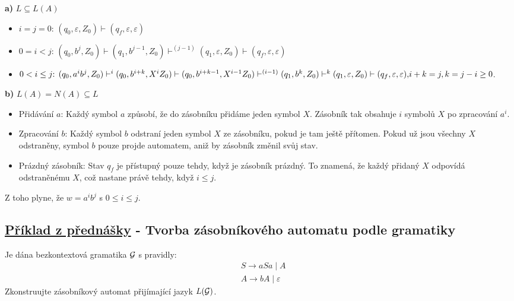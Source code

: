 \textbf{a)} $L \subseteq L(A)$
\begin{itemize}[leftmargin=*]
    \item $i=j=0 \text{: } (q_0, \varepsilon, Z_0) \vdash (q_f, \varepsilon, \varepsilon)$
    \item $0=i < j \text{: } (q_0, b^j, Z_0) \vdash (q_1, b^{j-1}, Z_0) \vdash^{(j-1)} (q_1, \varepsilon, Z_0) 
    \vdash (q_f, \varepsilon, \varepsilon)$
    \item ${0<i \leq j \text{: } (q_0, a^i b^j, Z_0) \vdash^i (q_0, b^{i+k}, X^i Z_0) \vdash (q_0, b^{i+k-1}, X^{i-1} Z_0)
    \vdash^{(i-1)} (q_1, b^k, Z_0) \vdash^k (q_1, \varepsilon, Z_0) \vdash (q_f, \varepsilon, \varepsilon),}\\
    i+k = j, k=j-i \geq 0$.
\end{itemize}
\textbf{b)} $L(A) = N(A) \subseteq L$
\begin{itemize}[leftmargin=*,noitemsep]
    \item Přidávání $a$:
    Každý symbol $a$ způsobí, že do zásobníku přidáme jeden symbol $X$. Zásobník tak obsahuje $i$ symbolů $X$ po 
    zpracování $a^i$.
    \item Zpracování $b$:
    Každý symbol $b$ odstraní jeden symbol $X$ ze zásobníku, pokud je tam ještě přítomen. Pokud už jsou všechny $X$ 
    odstraněny, symbol $b$ pouze projde automatem, aniž by zásobník změnil svůj stav.
    \item Prázdný zásobník:
    Stav $q_f$ je přístupný pouze tehdy, když je zásobník prázdný. To znamená, že každý přidaný $X$ odpovídá 
    odstraněnému $X$, což nastane právě tehdy, když $i \leq j$.
\end{itemize}
Z toho plyne, že $w = a^i b^j$ s $0 \leq i \leq j$.

\subsection{\href{https://youtu.be/9zpbNd1Yqnc?list=PLQL6z4JeTTQkLuzI78OTnfYBclE1g0UjS&t=1621}{Příklad z přednášky} - Tvorba zásobníkového automatu podle gramatiky}
Je dána bezkontextová gramatika $\mathcal{G}$ s pravidly:
\begin{align*}
    &S \rightarrow aSa \mid A \\
    &A \rightarrow bA \mid \varepsilon
\end{align*}
Zkonstruujte zásobníkový automat přijímající jazyk $L(\mathcal{G})$.
